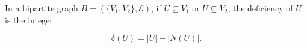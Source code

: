 In a bipartite graph $B = (\{V_1, V_2\}, \mathcal{E})$, if $U \subseteq V_1$ or $U \subseteq V_2$, the deficiency of $U$ is the integer

$$\delta(U) = |U| - |N(U)|.$$